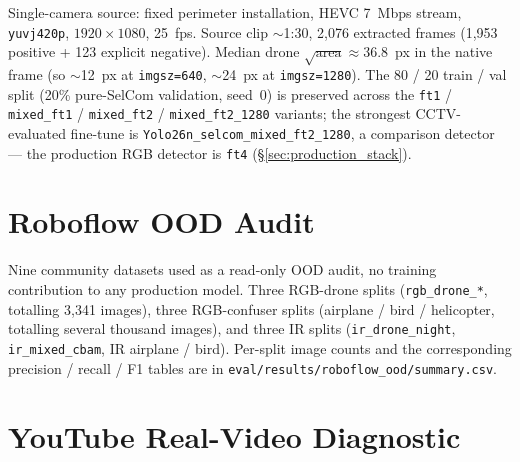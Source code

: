 Single-camera source: fixed perimeter installation, HEVC 7~Mbps stream, \texttt{yuvj420p}, $1920{\times}1080$, 25~fps. Source clip $\sim$1:30, 2{,}076 extracted frames (1{,}953 positive + 123 explicit negative). Median drone $\sqrt{\text{area}} \approx 36.8$~px in the native frame (so $\sim$12~px at \texttt{imgsz=640}, $\sim$24~px at \texttt{imgsz=1280}). The 80 / 20 train / val split (20\% pure-SelCom validation, seed~0) is preserved across the \texttt{ft1} / \texttt{mixed\_ft1} / \texttt{mixed\_ft2} / \texttt{mixed\_ft2\_1280} variants; the strongest CCTV-evaluated fine-tune is \texttt{Yolo26n\_selcom\_mixed\_ft2\_1280}, a comparison detector --- the production RGB detector is \texttt{ft4} (\S\ref{sec:production_stack}).

\section{Roboflow OOD Audit}

Nine community datasets used as a read-only OOD audit, no training contribution to any production model. Three RGB-drone splits (\texttt{rgb\_drone\_*}, totalling 3{,}341 images), three RGB-confuser splits (airplane / bird / helicopter, totalling several thousand images), and three IR splits (\texttt{ir\_drone\_night}, \texttt{ir\_mixed\_cbam}, IR airplane / bird). Per-split image counts and the corresponding precision / recall / F1 tables are in \texttt{eval/results/roboflow\_ood/summary.csv}.

\section{YouTube Real-Video Diagnostic}

